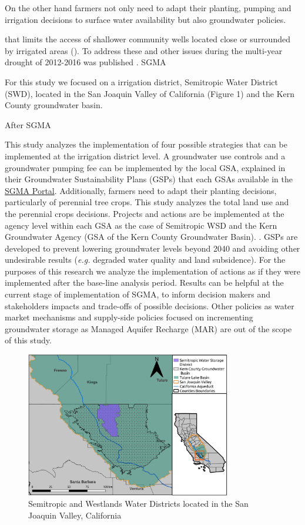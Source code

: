 \documentclass[11pt,a4paper]{article}
\begin{document}
 
 On the other hand farmers not only need to adapt their planting, pumping and irrigation decisions to surface water availability but also groundwater policies.
 
 that limits the access of shallower community wells located close or surrounded by irrigated areas (\cite{pauloo_domestic_2020}). To address these and other issues during the multi-year drought of 2012-2016  was published . SGMA  
 
 For this study we focused on a irrigation district, Semitropic Water District (SWD), located in the San Joaquin Valley of California (Figure 1) and the Kern County groundwater basin.

After SGMA 

This study analyzes the implementation of four possible strategies that can be implemented at the irrigation district level. A groundwater use controls and a groundwater pumping fee can be implemented by the local GSA, explained in their Groundwater Sustainability Plans (GSPs) that each GSAs available in the \hyperlink{https://water.ca.gov/Programs/Groundwater-Management/SGMA-Groundwater-Management/Groundwater-Sustainable-Agencies}{SGMA Portal}. Additionally, farmers need to adapt their planting decisions, particularly of perennial tree crops. This study analyzes the total land use and the perennial crops decisions.  Projects and actions are be implemented at the agency level within each GSA as the case of Semitropic WSD and the Kern Groundwater Agency (GSA of the Kern County Groundwater Basin). . GSPs are developed to prevent lowering groundwater levels beyond 2040 and avoiding other undesirable results (\textit{e.g.} degraded water quality and land subsidence). For the purposes of this research we analyze the implementation of actions as if they were implemented after the base-line analysis period. Results can be helpful at the current stage of implementation of SGMA, to inform decision makers and stakeholders impacts and trade-offs of possible decisions. Other policies as water market mechanisms and supply-side policies focused on incrementing groundwater storage as Managed Aquifer Recharge (MAR) are out of the scope of this study. 

\begin{figure}[H]
    \centering
    \includegraphics[width=0.8\textwidth]{Map_Semitropic.jpg}
    \caption{Semitropic and Westlands Water Districts located in the San Joaquin Valley, California}
    \label{fig:1}
\end{figure}
\end{document}
